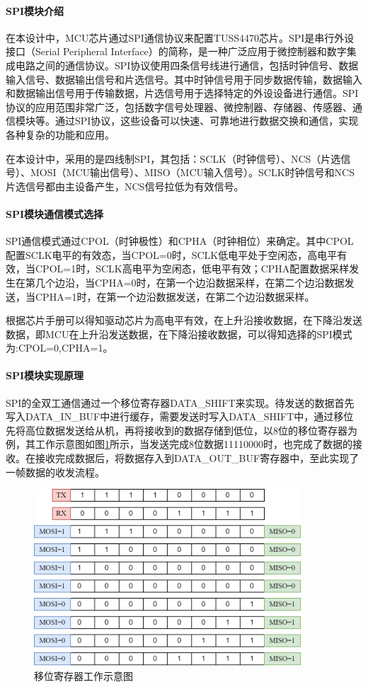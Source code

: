    \paragraph{SPI模块介绍}
    在本设计中，MCU芯片通过SPI通信协议来配置TUSS4470芯片。SPI是串行外设接口（Serial Peripheral Interface）的简称，是一种广泛应用于微控制器和数字集成电路之间的通信协议。SPI协议使用四条信号线进行通信，包括时钟信号、数据输入信号、数据输出信号和片选信号。其中时钟信号用于同步数据传输，数据输入和数据输出信号用于传输数据，片选信号用于选择特定的外设设备进行通信。SPI协议的应用范围非常广泛，包括数字信号处理器、微控制器、存储器、传感器、通信模块等。通过SPI协议，这些设备可以快速、可靠地进行数据交换和通信，实现各种复杂的功能和应用。
    
    在本设计中，采用的是四线制SPI，其包括：SCLK（时钟信号）、NCS（片选信号）、MOSI（MCU输出信号）、MISO（MCU输入信号）。SCLK时钟信号和NCS片选信号都由主设备产生，NCS信号拉低为有效信号。

    \paragraph{SPI模块通信模式选择}
    SPI通信模式通过CPOL（时钟极性）和CPHA（时钟相位）来确定。其中CPOL配置SCLK电平的有效态，当CPOL=0时，SCLK低电平处于空闲态，高电平有效，当CPOL=1时，SCLK高电平为空闲态，低电平有效；CPHA配置数据采样发生在第几个边沿，当CPHA=0时，在第一个边沿数据采样，在第二个边沿数据发送，当CPHA=1时，在第一个边沿数据发送，在第二个边沿数据采样。\par
    根据芯片手册可以得知驱动芯片为高电平有效，在上升沿接收数据，在下降沿发送数据，即MCU在上升沿发送数据，在下降沿接收数据，可以得知选择的SPI模式为:CPOL=0,CPHA=1。
    
    \paragraph{SPI模块实现原理}
    SPI的全双工通信通过一个移位寄存器DATA\_SHIFT来实现。待发送的数据首先写入DATA\_IN\_BUF中进行缓存，需要发送时写入DATA\_SHIFT中，通过移位先将高位数据发送给从机，再将接收到的数据存储到低位，以8位的移位寄存器为例，其工作示意图如图\ref{移位寄存器工作示意图}所示，当发送完成8位数据11110000时，也完成了数据的接收。在接收完成数据后，将数据存入到DATA\_OUT\_BUF寄存器中，至此实现了一帧数据的收发流程。
        \begin{figure}[ht]
        \centering
        \includegraphics[width=10cm]{figure/DATA_SHIFT.png}
        \caption{移位寄存器工作示意图}
        \label{移位寄存器工作示意图}
    \end{figure}
    
